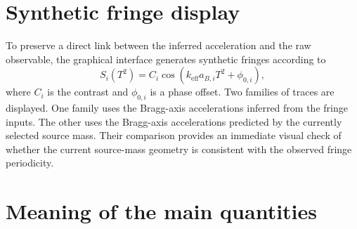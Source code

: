 \documentclass[11pt]{article}
\begin{document}
\section{Synthetic fringe display}

To preserve a direct link between the inferred acceleration and the raw observable, the graphical interface generates synthetic fringes according to
\begin{equation}
 S_i(T^2) = C_i \cos\!\left(k_{\mathrm{eff}} a_{B,i} T^2 + \phi_{0,i}\right),
 \label{eq:synthetic_signal}
\end{equation}
where $C_i$ is the contrast and $\phi_{0,i}$ is a phase offset. Two families of traces are displayed. One family uses the Bragg-axis accelerations inferred from the fringe inputs. The other uses the Bragg-axis accelerations predicted by the currently selected source mass. Their comparison provides an immediate visual check of whether the current source-mass geometry is consistent with the observed fringe periodicity.

\section{Meaning of the main quantities}
\end{document}
